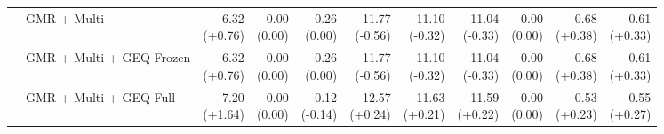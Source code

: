 \documentclass{article}
\begin{document}
{\begin{tabular}{llrrrrrrrrr}
 & GMR + Multi & \shortstack{6.32 \\ {\scriptsize\textcolor{Gain}{(+0.76)}}} & \shortstack{0.00 \\ {\scriptsize\textcolor{Zero}{(0.00)}}} & \shortstack{0.26 \\ {\scriptsize\textcolor{Zero}{(0.00)}}} & \shortstack{11.77 \\ {\scriptsize\textcolor{Loss}{(-0.56)}}} & \shortstack{11.10 \\ {\scriptsize\textcolor{Loss}{(-0.32)}}} & \shortstack{11.04 \\ {\scriptsize\textcolor{Loss}{(-0.33)}}} & \shortstack{0.00 \\ {\scriptsize\textcolor{Zero}{(0.00)}}} & \shortstack{0.68 \\ {\scriptsize\textcolor{Gain}{(+0.38)}}} & \shortstack{0.61 \\ {\scriptsize\textcolor{Gain}{(+0.33)}}} \\
 & GMR + Multi + GEQ Frozen & \shortstack{6.32 \\ {\scriptsize\textcolor{Gain}{(+0.76)}}} & \shortstack{0.00 \\ {\scriptsize\textcolor{Zero}{(0.00)}}} & \shortstack{0.26 \\ {\scriptsize\textcolor{Zero}{(0.00)}}} & \shortstack{11.77 \\ {\scriptsize\textcolor{Loss}{(-0.56)}}} & \shortstack{11.10 \\ {\scriptsize\textcolor{Loss}{(-0.32)}}} & \shortstack{11.04 \\ {\scriptsize\textcolor{Loss}{(-0.33)}}} & \shortstack{0.00 \\ {\scriptsize\textcolor{Zero}{(0.00)}}} & \shortstack{0.68 \\ {\scriptsize\textcolor{Gain}{(+0.38)}}} & \shortstack{0.61 \\ {\scriptsize\textcolor{Gain}{(+0.33)}}} \\
 & GMR + Multi + GEQ Full & \shortstack{7.20 \\ {\scriptsize\textcolor{Gain}{(+1.64)}}} & \shortstack{0.00 \\ {\scriptsize\textcolor{Zero}{(0.00)}}} & \shortstack{0.12 \\ {\scriptsize\textcolor{Loss}{(-0.14)}}} & \shortstack{12.57 \\ {\scriptsize\textcolor{Gain}{(+0.24)}}} & \shortstack{11.63 \\ {\scriptsize\textcolor{Gain}{(+0.21)}}} & \shortstack{11.59 \\ {\scriptsize\textcolor{Gain}{(+0.22)}}} & \shortstack{0.00 \\ {\scriptsize\textcolor{Zero}{(0.00)}}} & \shortstack{0.53 \\ {\scriptsize\textcolor{Gain}{(+0.23)}}} & \shortstack{0.55 \\ {\scriptsize\textcolor{Gain}{(+0.27)}}} \\

\end{tabular}}
\end{document}
